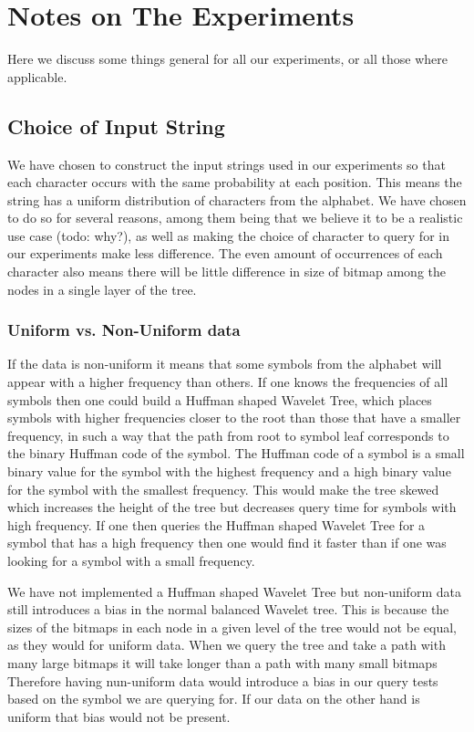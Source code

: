 \section{Notes on The Experiments}
Here we discuss some things general for all our experiments, or all those where applicable.

\subsection{Choice of Input String}
We have chosen to construct the input strings used in our experiments so that each character occurs with the same probability at each position.
This means the string has a uniform distribution of characters from the alphabet.
We have chosen to do so for several reasons, among them being that we believe it to be a realistic use case (todo: why?), as well as making the choice of character to query for in our experiments make less difference.
The even amount of occurrences of each character also means there will be little difference in size of bitmap among the nodes in a single layer of the tree.

\subsubsection{Uniform vs. Non-Uniform data}
If the data is non-uniform it means that some symbols from the alphabet will appear with a higher frequency than others.
If one knows the frequencies of all symbols then one could build a Huffman shaped Wavelet Tree, which places symbols with higher frequencies closer to the root than those that have a smaller frequency, in such a way that the path from root to symbol leaf corresponds to the binary Huffman code of the symbol. 
The Huffman code of a symbol is a small binary value for the symbol with the highest frequency and a high binary value for the symbol with the smallest frequency.
This would make the tree skewed which increases the height of the tree but decreases query time for symbols with high frequency.
If one then queries the Huffman shaped Wavelet Tree for a symbol that has a high frequency then one would find it faster than if one was looking for a symbol with a small frequency.

We have not implemented a Huffman shaped Wavelet Tree but non-uniform data still introduces a bias in the normal balanced Wavelet tree.
This is because the sizes of the bitmaps in each node in a given level of the tree would not be equal, as they would for uniform data.
When we query the tree and take a path with many large bitmaps it will take longer than a path with many small bitmaps
Therefore having nun-uniform data would introduce a bias in our query tests based on the symbol we are querying for. 
If our data on the other hand is uniform that bias would not be present.

